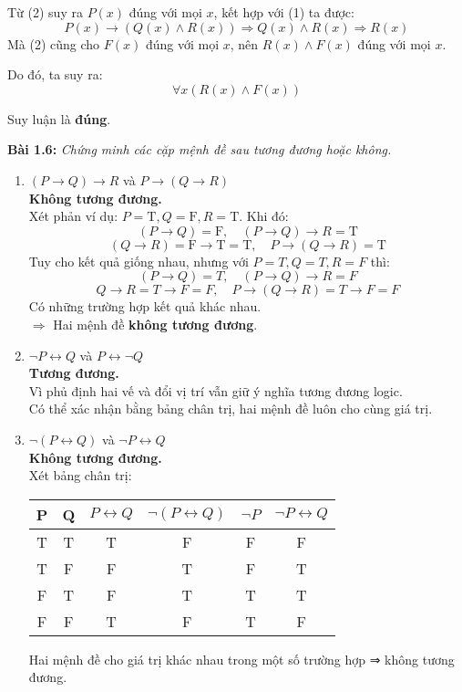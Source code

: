 \documentclass[12pt]{article}
\begin{document}
Từ (2) suy ra \(P(x)\) đúng với mọi \(x\), kết hợp với (1) ta được:
\[
P(x) \rightarrow (Q(x) \land R(x)) \Rightarrow Q(x) \land R(x) \Rightarrow R(x)
\]
Mà (2) cũng cho \(F(x)\) đúng với mọi \(x\), nên \(R(x) \land F(x)\) đúng với mọi \(x\).

Do đó, ta suy ra:
\[
\boxed{\forall x (R(x) \land F(x))}
\]

Suy luận là \textbf{đúng}.


\vspace{1em}
\noindent\textbf{Bài 1.6:} \textit{Chứng minh các cặp mệnh đề sau tương đương hoặc không.}


\begin{enumerate}[label=\alph*)]

\item $(P \rightarrow Q) \rightarrow R$ và $P \rightarrow (Q \rightarrow R)$\\
\textbf{Không tương đương.}\\
Xét phản ví dụ: $P = \text{T}, Q = \text{F}, R = \text{T}$. Khi đó:
\[
(P \rightarrow Q) = \text{F}, \quad (P \rightarrow Q) \rightarrow R = \text{T}
\]
\[
(Q \rightarrow R) = \text{F} \rightarrow \text{T} = \text{T}, \quad P \rightarrow (Q \rightarrow R) = \text{T}
\]
Tuy cho kết quả giống nhau, nhưng với $P = T, Q = T, R = F$ thì:
\[
(P \rightarrow Q) = T, \quad (P \rightarrow Q) \rightarrow R = F
\]
\[
Q \rightarrow R = T \rightarrow F = F, \quad P \rightarrow (Q \rightarrow R) = T \rightarrow F = F
\]
Có những trường hợp kết quả khác nhau.\\
$\Rightarrow$ Hai mệnh đề \textbf{không tương đương}.

\item $\neg P \leftrightarrow Q$ và $P \leftrightarrow \neg Q$\\
\textbf{Tương đương.}\\
Vì phủ định hai vế và đổi vị trí vẫn giữ ý nghĩa tương đương logic.\\
Có thể xác nhận bằng bảng chân trị, hai mệnh đề luôn cho cùng giá trị.

\item $\neg (P \leftrightarrow Q)$ và $\neg P \leftrightarrow Q$\\
\textbf{Không tương đương.}\\
Xét bảng chân trị:

\begin{center}
\begin{tabular}{|c|c|c|c|c|c|}
\hline
P & Q & $P \leftrightarrow Q$ & $\neg (P \leftrightarrow Q)$ & $\neg P$ & $\neg P \leftrightarrow Q$ \\
\hline
T & T & T & F & F & F \\
T & F & F & T & F & T \\
F & T & F & T & T & T \\
F & F & T & F & T & F \\
\hline
\end{tabular}
\end{center}
Hai mệnh đề cho giá trị khác nhau trong một số trường hợp ⇒ không tương đương.


\end{enumerate}
\end{document}
